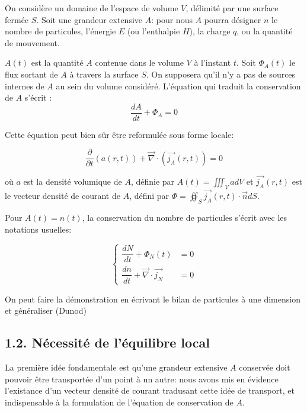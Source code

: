 \documentclass[french, a4paper, 10pt, twocolumn, landscape]{article}
\begin{document}
On considère un domaine de l'espace de volume $V$, délimité par une surface fermée $S$. Soit une grandeur extensive $A$: pour nous $A$ pourra désigner $n$ le nombre de particules, l'énergie $E$ (ou l'enthalpie $H$), la charge $q$, ou la quantité de mouvement.\medskip

$A(t)$ est la quantité $A$ contenue dans le volume $V$ à l'instant $t$. Soit $\Phi_A(t)$ le flux sortant de $A$ à travers la surface $S$. On supposera qu'il n'y a pas de sources internes de $A$ au sein du volume considéré. L'équation qui traduit la conservation de $A$ s'écrit : 
\begin{equation}
  \dfrac{dA}{dt}+\Phi_A=0  
\end{equation}

Cette équation peut bien sûr être reformulée sous forme locale: 

\begin{equation}
  \dfrac{\partial}{\partial t}\left(a(r,t)\right)+\vec{\nabla}\cdot\left(\vec{j_A}(r,t)\right)=0
\end{equation}

où $a$ est la densité volumique de $A$, définie par $A(t)=\iiint_{V}{adV}$ et $\vec{j_A}(r,t)$ est le vecteur densité de courant de $A$, défini par $\Phi=\oiint_{S}{\vec{j_A}(r,t)\cdot\vec{n}dS}$.\medskip

Pour $A(t)=n(t)$, la conservation du nombre de particules s'écrit avec les notations usuelles:

\begin{equation}
  \left\{\begin{array}{ll}
    \dfrac{dN}{dt}+\Phi_N(t) &=0\\
    \dfrac{dn}{dt}+\vec{\nabla}\cdot\vec{j_N}&=0
  \end{array}
  \right.
\end{equation}

On peut faire la démonstration en écrivant le bilan de particules à une dimension et généraliser (Dunod)
\subsection*{1.2. Nécessité de l'équilibre local}

La première idée fondamentale est qu'une grandeur extensive $A$ conservée doit pouvoir être transportée d'un point à un autre: nous avons mis en évidence l'existance d'un vecteur densité de courant tradusant cette idée de transport, et indispensable à la formulation de l'équation de conservation de $A$.\medskip
\end{document}
